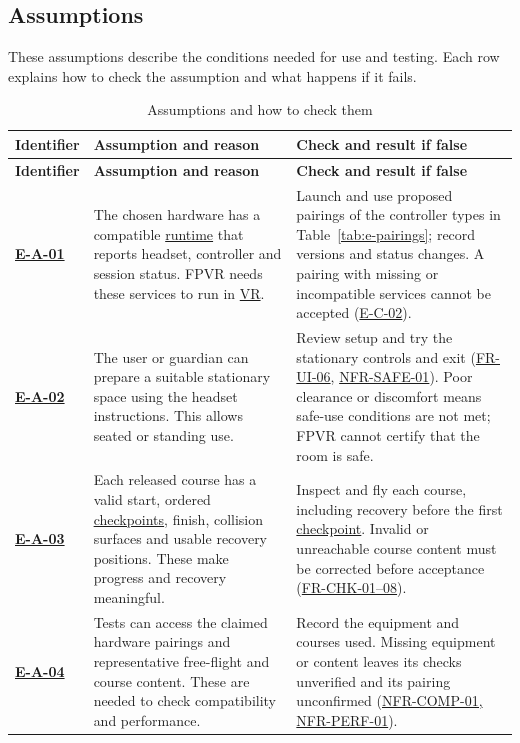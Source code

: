 \documentclass[12pt]{article}
\begin{document}
\subsection{Assumptions}\label{e3}

These assumptions describe the conditions needed for use and testing.
Each row explains how to check the assumption and what happens if it fails.

\begingroup\small\renewcommand{\arraystretch}{1.15}
\begin{longtable}{@{}>{\raggedright\arraybackslash}p{}
                         >{\raggedright\arraybackslash}p{}
                         >{\raggedright\arraybackslash}p{}@{}}
\caption{Assumptions and how to check them}\label{tab:e-assumptions}\\
\toprule\textbf{Identifier} & \textbf{Assumption and reason} &
\textbf{Check and result if false}\\\midrule\endfirsthead
\toprule\textbf{Identifier} & \textbf{Assumption and reason} &
\textbf{Check and result if false}\\\midrule\endhead
\bottomrule\endfoot
{}\label{ea-runtime}\hyperref[et-platform]{\textbf{E-A-01}} &
The chosen hardware has a compatible \hyperlink{glos:Runtime}{runtime} that reports headset, controller
and session status. FPVR needs these services to run in \hyperlink{glos:VR}{VR}. &
Launch and use proposed pairings of the controller types in
Table~\ref{tab:e-pairings}; record
versions and status changes. A pairing with missing or incompatible services
cannot be accepted (\hyperref[ec-hardware]{E-C-02}). \\
\label{ea-space}\hyperref[et-safety]{\textbf{E-A-02}} &
The user or guardian can prepare a suitable stationary space using the
headset instructions. This allows seated or standing use. &
Review setup and try the stationary controls and exit
(\hyperref[sec:s2-interface]{FR-UI-06},
\hyperref[sec:s2-nfr]{NFR-SAFE-01}). Poor clearance or discomfort means safe-use
conditions are not met; FPVR cannot certify that the room is safe. \\
\label{ea-course}\hyperref[et-course]{\textbf{E-A-03}} &
Each released course has a valid start, ordered \hyperlink{glos:Checkpoint}{checkpoints}, finish, collision
surfaces and usable recovery positions. These make progress and recovery
meaningful. &
Inspect and fly each course, including recovery before the first \hyperlink{glos:Checkpoint}{checkpoint}.
Invalid or unreachable course content must be corrected before acceptance
(\hyperref[sec:s2-checkpoints]{FR-CHK-01--08}). \\
\label{ea-evaluation}\hyperref[et-platform]{\textbf{E-A-04}} &
Tests can access the claimed hardware pairings and representative free-flight
and course content. These are needed to check compatibility and performance. &
Record the equipment and courses used. Missing equipment or content leaves
its checks unverified and its pairing unconfirmed
(\hyperref[sec:s2-nfr]{NFR-COMP-01, NFR-PERF-01}). \\
\end{longtable}\endgroup
\end{document}
